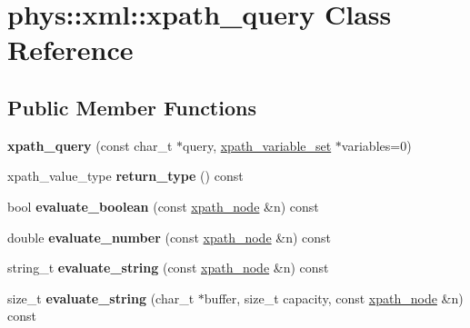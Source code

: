 \hypertarget{classphys_1_1xml_1_1xpath__query}{
\section{phys::xml::xpath\_\-query Class Reference}
\label{de/d9e/classphys_1_1xml_1_1xpath__query}
}
\subsection*{Public Member Functions}
\begin{DoxyCompactItemize}
\item 
\hypertarget{classphys_1_1xml_1_1xpath__query_ac46d4ff6f40637d5a4d0a2069f340ee1}{
{\bfseries xpath\_\-query} (const char\_\-t $\ast$query, \hyperlink{classphys_1_1xml_1_1xpath__variable__set}{xpath\_\-variable\_\-set} $\ast$variables=0)}
\label{de/d9e/classphys_1_1xml_1_1xpath__query_ac46d4ff6f40637d5a4d0a2069f340ee1}

\item 
\hypertarget{classphys_1_1xml_1_1xpath__query_a8608ffaa93cb84bea6b64a14c7af8740}{
xpath\_\-value\_\-type {\bfseries return\_\-type} () const }
\label{de/d9e/classphys_1_1xml_1_1xpath__query_a8608ffaa93cb84bea6b64a14c7af8740}

\item 
\hypertarget{classphys_1_1xml_1_1xpath__query_a9c77ca350afe9d4ca792b85f1aff8972}{
bool {\bfseries evaluate\_\-boolean} (const \hyperlink{classphys_1_1xml_1_1xpath__node}{xpath\_\-node} \&n) const }
\label{de/d9e/classphys_1_1xml_1_1xpath__query_a9c77ca350afe9d4ca792b85f1aff8972}

\item 
\hypertarget{classphys_1_1xml_1_1xpath__query_add3ce64b470ba4501cc138d26dfc04ff}{
double {\bfseries evaluate\_\-number} (const \hyperlink{classphys_1_1xml_1_1xpath__node}{xpath\_\-node} \&n) const }
\label{de/d9e/classphys_1_1xml_1_1xpath__query_add3ce64b470ba4501cc138d26dfc04ff}

\item 
\hypertarget{classphys_1_1xml_1_1xpath__query_a050de5645c30898e1fbc4eb3cef8155a}{
string\_\-t {\bfseries evaluate\_\-string} (const \hyperlink{classphys_1_1xml_1_1xpath__node}{xpath\_\-node} \&n) const }
\label{de/d9e/classphys_1_1xml_1_1xpath__query_a050de5645c30898e1fbc4eb3cef8155a}

\item 
\hypertarget{classphys_1_1xml_1_1xpath__query_a6c976cc4bd67c68db71a6d655f4e16f2}{
size\_\-t {\bfseries evaluate\_\-string} (char\_\-t $\ast$buffer, size\_\-t capacity, const \hyperlink{classphys_1_1xml_1_1xpath__node}{xpath\_\-node} \&n) const }
\label{de/d9e/classphys_1_1xml_1_1xpath__query_a6c976cc4bd67c68db71a6d655f4e16f2}


\end{DoxyCompactItemize}
